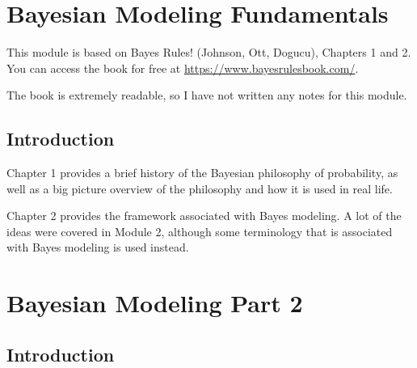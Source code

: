 \documentclass[
]{book}
\begin{document}
\hypertarget{bayesian-modeling-fundamentals}{%
\chapter{Bayesian Modeling Fundamentals}\label{bayesian-modeling-fundamentals}}

This module is based on Bayes Rules! (Johnson, Ott, Dogucu), Chapters 1 and 2. You can access the book for free at \url{https://www.bayesrulesbook.com/}.

The book is extremely readable, so I have not written any notes for this module.

\hypertarget{introduction-7}{%
\section{Introduction}\label{introduction-7}}

Chapter 1 provides a brief history of the Bayesian philosophy of probability, as well as a big picture overview of the philosophy and how it is used in real life.

Chapter 2 provides the framework associated with Bayes modeling. A lot of the ideas were covered in Module 2, although some terminology that is associated with Bayes modeling is used instead.

\hypertarget{bayesian-modeling-part-2}{%
\chapter{Bayesian Modeling Part 2}\label{bayesian-modeling-part-2}}

\hypertarget{introduction-8}{%
\section{Introduction}\label{introduction-8}}

  
\end{document}
